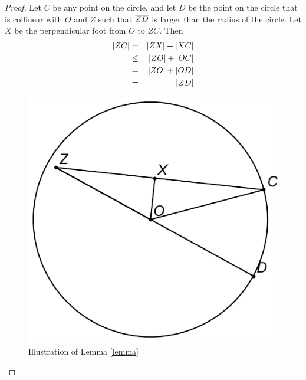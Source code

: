 \begin{proof} Let $C$ be any point on the circle, and let $D$ be the point on the circle that is collinear with $O$ and $Z$ such that $\displaystyle \overline{ZD}$ is larger than the radius of the circle. Let $X$ be the perpendicular foot from $O$ to $ZC$. Then
\begin{eqnarray*}
 \left| ZC \right| & = & \left| ZX \right| + \left| XC \right| \\
 & \leq & \left| ZO \right| + \left| OC \right| \\
 & = & \left| ZO \right| + \left| OD \right| \\
 & = & \left| ZD \right|
\end{eqnarray*}

\begin{figure}[h]
\centering
\caption{Illustration of Lemma \ref{lemma}}
\includegraphics{images/image1}
\end{figure}
\end{proof}

